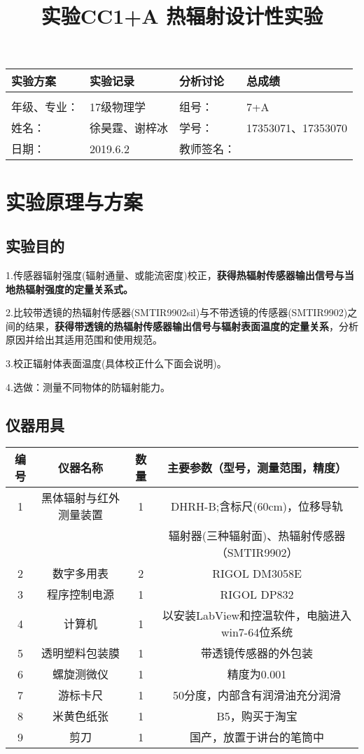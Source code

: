 \documentclass[utf8]{article}
\title{实验CC1+A 热辐射设计性实验}
\begin{document}
\maketitle  
	\begin{tabular}{|p{8em}|p{8em}|p{8em}|p{10em}|}
		\hline
		\large{实验方案} &\large{实验记录}  &\large{分析讨论} &\large{总成绩}\\
		\hline
		        &          &          &  \\
	    \hline
	\hline 
	年级、专业： &17级物理学 &组号：& 7+A \\
	\hline
	姓名：& 徐昊霆、谢梓冰 &学号：&17353071、17353070  \\
	\hline
	日期：& 2019.6.2 &教师签名： &  \\
    \hline	
        \end{tabular}

\newpage
\tableofcontents
\section{实验原理与方案}

\subsection{实验目的}
\par 
1.传感器辐射强度(辐射通量、或能流密度)校正，\textbf{获得热辐射传感器输出信号与当地热辐射强度的定量关系式。}
\par
2.比较带透镜的热辐射传感器(SMTIR9902sil)与不带透镜的传感器(SMTIR9902)之间的结果，\textbf{获得带透镜的热辐射传感器输出信号与辐射表面温度的定量关系}，分析原因并给出其适用范围和使用规范。
\par 
3.校正辐射体表面温度(具体校正什么下面会说明)。
\par
4.选做：测量不同物体的防辐射能力。
\subsection{仪器用具}
		\begin{tabular}{c|c|c|c}
			\hline
			编号 & 仪器名称 &数量& 主要参数（型号，测量范围，精度） \\
			\hline 
			1 &  黑体辐射与红外测量装置 &1 &DHRH-B;含标尺(60cm)，位移导轨\\
			& & & 辐射器(三种辐射面)、热辐射传感器（SMTIR9902）\\
			2 & 数字多用表&2 & RIGOL DM3058E \\
			3 & 程序控制电源 & 1 &RIGOL DP832 \\
			4 & 计算机& 1 & 以安装LabView和控温软件，电脑进入win7-64位系统 \\
			5&透明塑料包装膜 &1& 带透镜传感器的外包装 \\
			6&螺旋测微仪&1& 精度为0.001\\
			7&游标卡尺&1& 50分度，内部含有润滑油充分润滑\\
			8&米黄色纸张&1& B5，购买于淘宝\\
			9&剪刀&1& 国产，放置于讲台的笔筒中\\
			\hline

\end{tabular}
\end{document}
